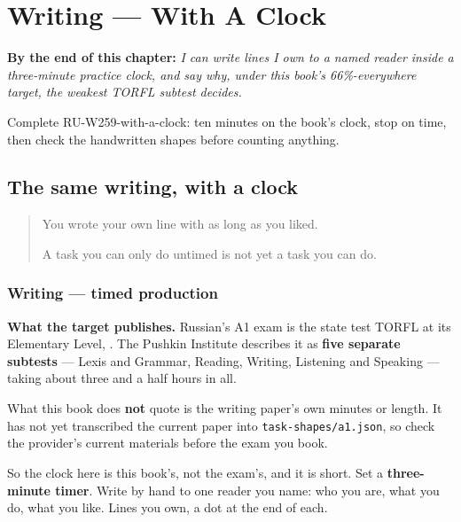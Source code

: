 
\chapter{Writing --- With A Clock}
\label{ch:ru-with-a-clock}

\begin{chapteropening}
\textbf{By the end of this chapter:} \emph{I can write lines I own to a named reader inside a three-minute practice clock, and say why, under this book's 66\%-everywhere target, the weakest TORFL subtest decides.}

Complete RU-W259-with-a-clock: ten minutes on the book's clock, stop on time, then check the handwritten shapes before counting anything.
\end{chapteropening}

\section[(with a clock)]{The same writing, with a clock}

\label{lesson:RU-W259-with-a-clock}



\begin{quote}
You wrote your own line with as long as you liked.

A task you can only do untimed is not yet a task you can do.
\end{quote}

\subsection*{Writing — timed production}
\textbf{What the target publishes.} Russian's A1 exam is the state test TORFL at its Elementary Level, \textbf{}. The Pushkin Institute describes it as \textbf{five separate subtests} — Lexis and Grammar, Reading, Writing, Listening and Speaking — taking about three and a half hours in all.

What this book does \textbf{not} quote is the writing paper's own minutes or length. It has not yet transcribed the current paper into \texttt{task-shapes/a1.json}, so check the provider's current materials before the exam you book.

So the clock here is this book's, not the exam's, and it is short. Set a \textbf{three-minute timer}. Write by hand to one reader you name: who you are, what you do, what you like. Lines you own, a dot at the end of each.

